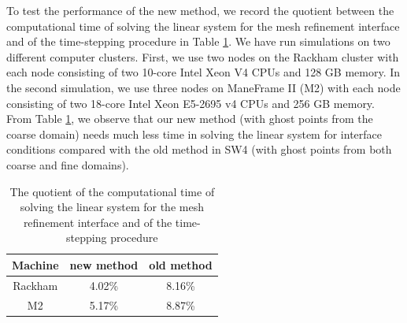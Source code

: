 To test the performance of the new method, we record the quotient between the computational time of solving the linear system for the mesh refinement interface and of the time-stepping procedure in Table \ref{time}. We have run simulations on two different computer clusters. First, we use two nodes on the Rackham cluster with each node consisting of two 10-core Intel Xeon V4 CPUs and 128 GB memory. In the second simulation, we use three nodes on ManeFrame II (M2) with each node consisting of two 18-core Intel Xeon E5-2695 v4 CPUs and 256 GB memory. From Table \ref{time}, we observe that our new method (with ghost points from the coarse domain) needs much less time in solving the linear system for interface conditions compared with the old method in SW4 (with ghost points from both coarse and fine domains).

\begin{table}[htbp]
	\begin{center}
		\begin{tabular}{|c|c|c|}
			\hline
			Machine   & new method & old method \\
			\hline
			Rackham & 4.02\% &  8.16\%\\
			\hline
			M2 &5.17\% & 8.87\%\\
			\hline 
		\end{tabular}
	\end{center}
		\caption{The quotient of the computational time of solving the linear system for the mesh refinement interface and of the time-stepping procedure}\label{time}
\end{table} 



